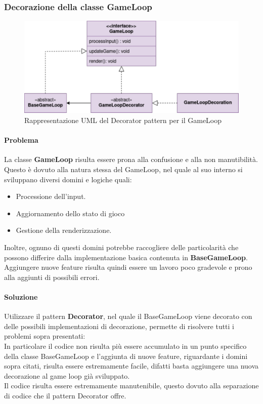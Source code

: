 \documentclass[a4paper,12pt]{report}
\begin{document}
\subsubsection*{Decorazione della classe GameLoop}
%
\begin{figure}[H]
	\centering{}
	\includegraphics[scale=0.75]{img/GameLoopDecorator.pdf}
	\caption{Rappresentazione UML del Decorator pattern per il GameLoop}
	\label{img:strategy}
	\end{figure}
%	
\paragraph*{Problema} La classe \textbf{GameLoop} risulta essere prona alla confusione e alla non manutibilità.
Questo è dovuto alla natura stessa del GameLoop, nel quale al suo interno si sviluppano diversi domini e logiche quali:
\begin{itemize}
	\item Processione dell'input.
	\item Aggiornamento dello stato di gioco
	\item Gestione della renderizzazione.
\end{itemize}
Inoltre, ognuno di questi domini potrebbe raccogliere delle particolarità che possono differire dalla implementazione basica contenuta in \textbf{BaseGameLoop}.
Aggiungere nuove feature risulta quindi essere un lavoro poco gradevole e prono alla aggiunti di possibili errori.
%
\paragraph*{Soluzione} Utilizzare il pattern \textbf{Decorator}, nel quale il BaseGameLoop viene decorato con delle possibili implementazioni di decorazione, permette di risolvere tutti i problemi sopra presentati:
\\
In particolare il codice non risulta più essere accumulato in un punto specifico della classe BaseGameLoop e 
l'aggiunta di nuove feature, riguardante i domini sopra citati, risulta essere estremamente facile, difatti basta aggiungere una nuova decorazione al game loop già sviluppato.
\\
Il codice risulta essere estremamente manutenibile, questo dovuto alla separazione di codice che il pattern Decorator offre.
%
\end{document}
